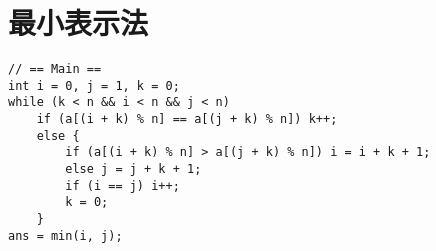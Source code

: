 \section{最小表示法}

\begin{verbatim}
// == Main ==
int i = 0, j = 1, k = 0;
while (k < n && i < n && j < n)
    if (a[(i + k) % n] == a[(j + k) % n]) k++;
    else {
        if (a[(i + k) % n] > a[(j + k) % n]) i = i + k + 1;
        else j = j + k + 1;
        if (i == j) i++;
        k = 0;
    }
ans = min(i, j);
\end{verbatim}